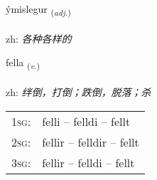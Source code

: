 \documentclass[frontgrid, backgrid]{flacards}\usepackage[]{graphicx}\usepackage[]{color}
\begin{document}
\renewcommand{\flhead}{\vskip5pt \fboxsep=0pt {\small\bfseries\footnotesize Lýsingarorð | 形容词}}
\renewcommand{\fcfoot}{\vskip5pt \fboxsep=0pt \hspace{2pt}{\small\bfseries\footnotesize 2K}}

\renewcommand{\blhead}{\vskip5pt {\small\bfseries\footnotesize Lýsingarorð | 形容词 }}
\renewcommand{\bcfoot}{\vskip5pt \hspace{2pt}{\small\bfseries\footnotesize 2K}}


{ýmislegur \small{\textsubscript{(\textit{adj.})}} \\[1ex] %
\textphonetic{[iːmɪstlɛɣʏr]} \\
zh: \emph{各种各样的} \\  [2ex]
\renewcommand*{\arraystretch}{0.8}
}

\renewcommand{\flhead}{\vskip5pt \fboxsep=0pt {\small\bfseries\footnotesize Sagnorð | 动词}}
\renewcommand{\fcfoot}{\vskip5pt \fboxsep=0pt \hspace{2pt}{\small\bfseries\footnotesize 2K}}

\renewcommand{\blhead}{\vskip5pt {\small\bfseries\footnotesize Sagnorð | 动词 }}
\renewcommand{\bcfoot}{\vskip5pt \hspace{2pt}{\small\bfseries\footnotesize 2K}}


{fella \small{\textsubscript{(\textit{v.})}} \\[1ex] %
\textphonetic{[fɛtla]} \\
zh: \emph{绊倒，打倒；跌倒，脱落；杀} \\  [2ex]
\renewcommand*{\arraystretch}{0.8}
\begin{tabular}{p{1cm}l}
\textsc{1sg}: & felli -- felldi -- fellt \\ 
\textsc{2sg}: & fellir -- felldir -- fellt \\ 
\textsc{3sg}: & fellir -- felldi -- fellt \\ 
\end{tabular}
}
\end{document}
